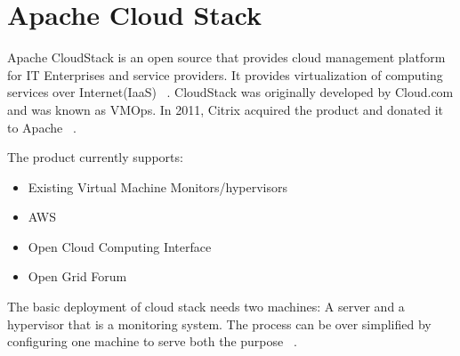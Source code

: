 \section{Apache Cloud Stack}

Apache CloudStack is an open source that provides cloud management platform for IT
Enterprises and service providers. 
It provides virtualization of computing services over Internet(IaaS)
~\cite{ hid-sp18-417-techtarget-cloudStack}. 
CloudStack was originally developed by Cloud.com and was known as VMOps. 
In 2011, Citrix acquired the product and donated it to Apache 
~\cite{ hid-sp18-417-wiki-cloudstack}. 

The product currently supports:
\begin{itemize}
\item        Existing Virtual Machine Monitors/hypervisors
\item        AWS
\item        Open Cloud Computing Interface
\item        Open Grid Forum
\end{itemize}
 The basic deployment of cloud stack needs two machines: 
 A server and a hypervisor that is a monitoring system. 
 The process can be over simplified by configuring one machine 
 to serve both the purpose ~\cite{ hid-sp18-417-doc-cloudstack}.
